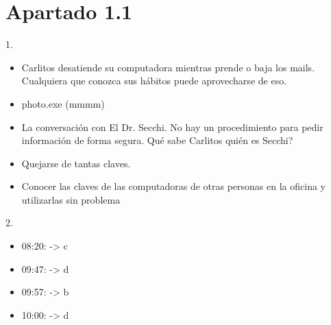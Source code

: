 %
% 
% 
% 








\tableofcontents
\newpage

\sectionfont{\scshape}


\section*{Apartado 1.1}

1.

\begin{itemize}
    \item Carlitos desatiende su computadora mientras prende o baja los mails. Cualquiera que conozca sus hábitos puede aprovecharse de eso.
    \item photo.exe (mmmm)
    \item La conversación con El Dr. Secchi. No hay un procedimiento para pedir información de forma segura. Qué sabe Carlitos quién es Secchi?
    \item Quejarse de tantas claves.
    \item Conocer las claves de las computadoras de otras personas en la oficina y utilizarlas sin problema
\end{itemize} 
2.

\begin{itemize}
    \item 08:20: -> c
    \item 09:47: -> d
    \item 09:57: -> b
    \item 10:00: -> d
\end{itemize}

